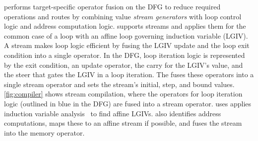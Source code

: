 \riptidecomp performs target-specific operator fusion on the DFG to
reduce required operations and routes by combining value {\em stream generators} with loop
control logic and address computation logic.
%
\riptide supports streams and applies them for the common case 
of a loop with an affine loop governing induction variable (LGIV).
%
A stream makes loop logic efficient by fusing the LGIV update and the loop
exit condition into a single operator.
%
In the DFG, loop iteration logic is represented by the exit condition, an
update operator, the carry for the LGIV's value, and the steer that
gates the LGIV in a loop iteration.
%
The \mend fuses these operators into a single stream operator and sets
the stream's initial, step, and bound values.
%
\autoref{fig:compiler} shows stream compilation, where
the operators for loop iteration logic (outlined in blue in the 
DFG) are fused into a stream operator.
%
\riptidecomp uses applies induction variable analysis~\cite{dragon,zima-scev} to 
find affine LGIVs. %
%
%
%
%
%
%
\riptidecomp also identifies address computations, maps these to an affine
stream if possible, and fuses the stream into the memory operator.
%


